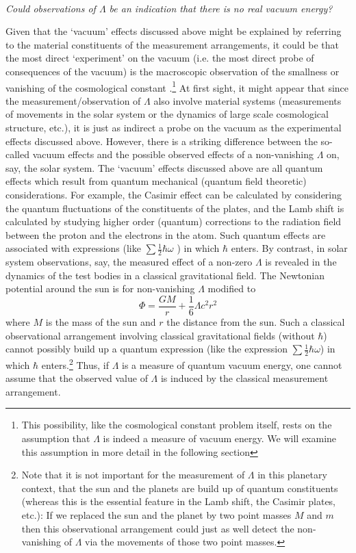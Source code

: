 \documentclass[12pt]{article}
\newcommand{\beq}{\begin{equation}}
\newcommand{\eeq}{\end{equation}}
\begin{document}
\ \\
{\em Could observations of $\Lambda$ be an indication that there
is no real vacuum energy?}

Given that the `vacuum' effects discussed above might be explained
by referring to the material constituents of the measurement
arrangements, it could be that the most direct `experiment' on the
vacuum (i.e. the most direct probe of consequences of the vacuum)
is the macroscopic observation of the smallness or vanishing of
the cosmological constant \cite{rugh96}.\footnote{This
possibility, like the cosmological constant problem itself, rests
on the assumption that $\Lambda$ is indeed a measure of vacuum
energy. We will examine this assumption in more detail in the
following section} At first sight, it might appear that since the
measurement/observation of $\Lambda$ also involve material systems
(measurements of movements in the solar system or the dynamics of
large scale cosmological structure, etc.), it is just as indirect
a probe on the vacuum as the experimental effects discussed above.
However, there is a striking difference between the so-called
vacuum effects and the possible observed effects of a
non-vanishing $\Lambda$ on, say, the solar system. The `vacuum'
effects discussed above are all quantum effects which result from
quantum mechanical (quantum field theoretic) considerations. For
example, the Casimir effect can be calculated by considering the
quantum fluctuations of the constituents of the plates, and the
Lamb shift is calculated by studying higher order (quantum)
corrections to the radiation field between the proton and the
electrons in the atom. Such quantum effects are associated with
expressions (like $\sum \frac{1}{2} \hbar \omega$ ) in which
$\hbar$ enters. By contrast, in solar system observations, say,
the measured effect of a non-zero $\Lambda$ is revealed in the
dynamics of the test bodies in a classical gravitational field.
The Newtonian potential around the sun is for non-vanishing
$\Lambda$ modified to \cite{gibbons77,axenides00} 
\beq 
\Phi=\frac{GM}{r}+ \frac{1}{6}
\Lambda c^2 r^2 
\eeq 
where $M$ is the mass of the sun and $r$ the
distance from the sun. Such a classical observational arrangement
involving classical gravitational fields (without $\hbar$) cannot
possibly build up a quantum expression (like the expression $\sum
\frac{1}{2}\hbar \omega$) in which $\hbar$ enters.\footnote{Note
that it is not important for the measurement of $\Lambda$ in this
planetary context, that the sun and the planets are build up of
quantum constituents (whereas this is the essential feature in the
Lamb shift, the Casimir plates, etc.): If we replaced the sun and
the planet by two point masses $M$ and $m$ then this observational
arrangement could just as well detect the non-vanishing of
$\Lambda$ via the movements of those two point masses.} Thus, if
$\Lambda$ is a measure of quantum vacuum energy, one cannot assume
that the observed value of $\Lambda$ is induced by the
classical measurement arrangement.
\end{document}
